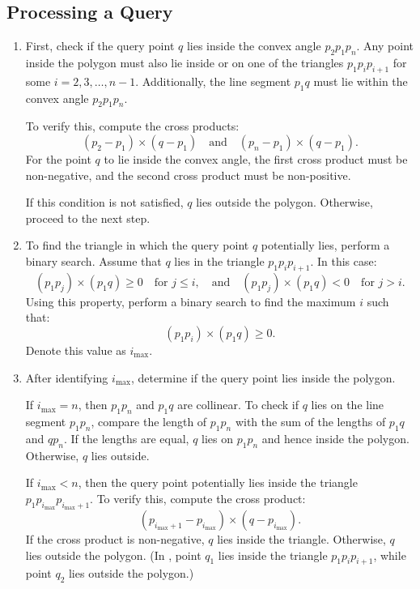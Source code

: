 \documentclass[12pt]{article}
\begin{document}
\subsection*{Processing a Query}
\begin{enumerate}
    \item First, check if the query point \(q\) lies inside the convex angle \(p_2p_1p_n\). Any point inside the polygon must also lie inside or on one of the triangles \(p_1p_ip_{i+1}\) for some \(i = 2, 3, \ldots, n-1\). Additionally, the line segment \(p_1q\) must lie within the convex angle \(p_2p_1p_n\).  

    To verify this, compute the cross products:
    \[
    (p_2 - p_1) \times (q - p_1) \quad \text{and} \quad (p_n - p_1) \times (q - p_1).
    \]
    For the point \(q\) to lie inside the convex angle, the first cross product must be non-negative, and the second cross product must be non-positive.  

    If this condition is not satisfied, \(q\) lies outside the polygon. Otherwise, proceed to the next step.

    \item To find the triangle in which the query point \(q\) potentially lies, perform a binary search. Assume that \(q\) lies in the triangle \(p_1p_ip_{i+1}\). In this case:
    \[
    (p_1p_j) \times (p_1q) \geq 0 \quad \text{for } j \leq i, \quad \text{and} \quad (p_1p_j) \times (p_1q) < 0 \quad \text{for } j > i.
    \]
    Using this property, perform a binary search to find the maximum \(i\) such that:
    \[
    (p_1p_i) \times (p_1q) \geq 0.
    \]
    Denote this value as \(i_{\text{max}}\).

    \item After identifying \(i_{\text{max}}\), determine if the query point lies inside the polygon.  

    If \(i_{\text{max}} = n\), then \(p_1p_n\) and \(p_1q\) are collinear. To check if \(q\) lies on the line segment \(p_1p_n\), compare the length of \(p_1p_n\) with the sum of the lengths of \(p_1q\) and \(qp_n\). If the lengths are equal, \(q\) lies on \(p_1p_n\) and hence inside the polygon. Otherwise, \(q\) lies outside.  

    If \(i_{\text{max}} < n\), then the query point potentially lies inside the triangle \(p_1p_{i_{\text{max}}}p_{i_{\text{max}}+1}\). To verify this, compute the cross product:
    \[
    (p_{i_{\text{max}}+1} - p_{i_{\text{max}}}) \times (q - p_{i_{\text{max}}}).
    \]
    If the cross product is non-negative, \(q\) lies inside the triangle. Otherwise, \(q\) lies outside the polygon. (In , point \(q_1\) lies inside the triangle \(p_1p_ip_{i+1}\), while point \(q_2\) lies outside the polygon.)
\end{enumerate}
\end{document}

